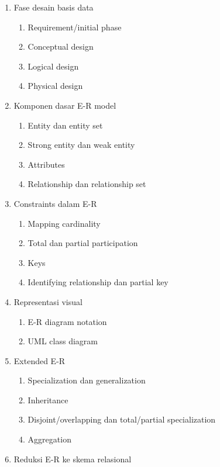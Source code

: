 \begin{enumerate}
    \item \pwajib Fase desain basis data
    \begin{enumerate}
        \item \pwajib Requirement/initial phase
        \item \pwajib Conceptual design
        \item \pwajib Logical design
        \item \ppaham Physical design
    \end{enumerate}
    \item \pwajib Komponen dasar E-R model
    \begin{enumerate}
        \item \pwajib Entity dan entity set
        \item \pwajib Strong entity dan weak entity
        \item \pwajib Attributes
        \item \pwajib Relationship dan relationship set
    \end{enumerate}
    \item \pwajib Constraints dalam E-R
    \begin{enumerate}
        \item \pwajib Mapping cardinality
        \item \pwajib Total dan partial participation
        \item \pwajib Keys
        \item \pwajib Identifying relationship dan partial key
    \end{enumerate}
    \item \pwajib Representasi visual
    \begin{enumerate}
        \item \pwajib E-R diagram notation
        \item \ppaham UML class diagram
    \end{enumerate}
    \item \pwajib Extended E-R
    \begin{enumerate}
        \item \pwajib Specialization dan generalization
        \item \pwajib Inheritance
        \item \pwajib Disjoint/overlapping dan total/partial specialization
        \item \pwajib Aggregation
    \end{enumerate}
    \item \pwajib Reduksi E-R ke skema relasional

\end{enumerate}
